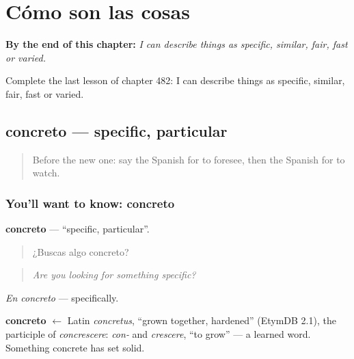 
\chapter{Cómo son las cosas}
\label{ch:es-como-son-las-cosas}

\begin{chapteropening}
\textbf{By the end of this chapter:} \emph{I can describe things as specific, similar, fair, fast or varied.}

Complete the last lesson of chapter 482: I can describe things as specific, similar, fair, fast or varied.
\end{chapteropening}

\section[concreto]{concreto — specific, particular}

\label{lesson:ES-C482-concreto}



\begin{quote}
Before the new one: say the Spanish for to foresee, then the Spanish for to watch.
\end{quote}

\subsection*{You'll want to know: concreto}
\textbf{concreto} — \textquotedblleft{}specific, particular\textquotedblright{}.

\begin{quote}
¿Buscas algo concreto?
\end{quote}

\begin{quote}
\emph{Are you looking for something specific?}
\end{quote}

\emph{En concreto} — specifically.

\begin{cousinweb}
\textbf{concreto} $\leftarrow$ Latin \emph{concretus}, \textquotedblleft{}grown together, hardened\textquotedblright{} (EtymDB 2.1), the participle of \emph{concrescere}: \emph{con-} and \emph{crescere}, \textquotedblleft{}to grow\textquotedblright{} — a learned word. Something concrete has set solid.
\end{cousinweb}

